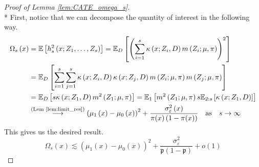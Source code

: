 \begin{proof}[Proof of Lemma \ref{lem:CATE_omega_s}]\mbox{}\\*
    First, notice that we can decompose the quantity of interest in the following way.
	\begin{equation}
		\begin{aligned}
			\Omega_{s}\left(x\right)
			 & = \mathbb{E}\left[h_{s}^{2}\left(x; Z_1, \ldots,  Z_{s}\right)\right]
             = \mathbb{E}_{D}\left[\left(\sum_{i = 1}^{s} \kappa\left(x; Z_{i}, D\right) m\left(Z_{i}; \mu, \pi\right)\right)^2\right]\\
             & = \mathbb{E}_{D}\left[\sum_{i = 1}^{s}\sum_{j = 1}^{s}\kappa\left(x; Z_{i}, D\right)\kappa\left(x; Z_{j}, D\right)
             m\left(Z_{i}; \mu, \pi\right)m\left(Z_{j}; \mu, \pi\right)\right] \\
             & = \mathbb{E}_{D}\left[s \kappa\left(x; Z_1, D\right)  m^2\left(Z_{1}; \mu, \pi\right)\right]
             = \mathbb{E}_{1}\left[ m^2\left(Z_{1}; \mu, \pi\right) s \mathbb{E}_{2:s}\left[\kappa\left(x; Z_1, D\right)\right]\right]\\
             & \overset{\text{(Lem \ref{lem:limit_res})}}{\longrightarrow}
			 \left(\mu_{1}\left(x\right) - \mu_{0}\left(x\right)\right)^2 + \frac{\sigma_{\varepsilon}^2\left(x\right)}{\pi(x)\left(1 - \pi(x)\right)}
            \quad \text{as} \quad
            s \rightarrow \infty
		\end{aligned}
	\end{equation}
    This gives us the desired result.
    \begin{equation}
        \Omega_{s}\left(x\right)
        \lesssim \left(\mu_{1}\left(x\right) - \mu_{0}\left(x\right)\right)^2 + \frac{\overline{\sigma}^2_{\varepsilon}}{\mathfrak{p}\left(1 - \mathfrak{p}\right)} + o(1)
    \end{equation}
\end{proof}

